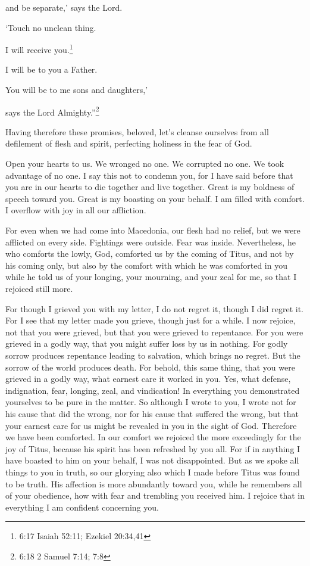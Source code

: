 and be separate,’ says the Lord.

‘Touch no unclean thing.

I will receive you.\footnote{6:17 Isaiah 52:11;
	Ezekiel 20:34,41}

\myverse{}I will be to you a Father.

You will be to me sons and daughters,’

says the Lord Almighty.”\footnote{6:18 2 Samuel 7:14;
	7:8}


\mychapter{} \myverse*{}Having therefore these promises, beloved, let’s cleanse ourselves
from all defilement of flesh and spirit, perfecting holiness in the fear of God.

\myverse{}Open your hearts to us. We wronged no one. We corrupted no one.
We took advantage of no one.
\myverse{}I say this not to condemn you, for I have said before that you are in our hearts
to die together and live together.
\myverse{}Great is my boldness of speech toward you. Great is my boasting on your behalf.
I am filled with comfort. I overflow with joy in all our affliction.

\myverse{}For even when we had come into Macedonia, our flesh had no relief,
but we were afflicted on every side. Fightings were outside. Fear was inside.
\myverse{}Nevertheless, he who comforts the lowly, God, comforted us by the coming of
Titus,
\myverse{}and not by his coming only, but also by the comfort with which he was comforted
in you while he told us of your longing, your mourning, and your zeal for me, so that I rejoiced still
more.

\myverse{}For though I grieved you with my letter, I do not regret it, though
I did regret it. For I see that my letter made you grieve, though just for a while.
\myverse{}I now rejoice, not that you were grieved, but that you were grieved to repentance.
For you were grieved in a godly way, that you might suffer loss by us in nothing.
\myverse{}For godly sorrow produces repentance leading to salvation, which brings no
regret. But the sorrow of the world produces death.
\myverse{}For behold, this same thing, that you were grieved in a godly way, what earnest
care it worked in you. Yes, what defense, indignation, fear, longing, zeal, and vindication! In everything
you demonstrated yourselves to be pure in the matter.
\myverse{}So although I wrote to you, I wrote not for his cause that did the wrong,
nor for his cause that suffered the wrong, but that your earnest care for us might be revealed in you
in the sight of God.
\myverse{}Therefore we have been comforted. In our comfort we rejoiced the more exceedingly
for the joy of Titus, because his spirit has been refreshed by you all.
\myverse{}For if in anything I have boasted to him on your behalf, I was not disappointed.
But as we spoke all things to you in truth, so our glorying also which I made before Titus was found to
be truth.
\myverse{}His affection is more abundantly toward you, while he remembers all of your
obedience, how with fear and trembling you received him.
\myverse{}I rejoice that in everything I am confident concerning you.


